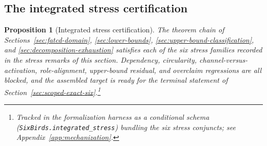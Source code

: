\documentclass[11pt]{article}
\newtheorem{proposition}[theorem]{Proposition}
\theoremstyle{definition}
\begin{document}
\subsection{The integrated stress certification}\label{subsec:integrated-stress-theorem}

\begin{proposition}[Integrated stress certification]\label{thm:integrated-stress}
The theorem chain of Sections~\ref{sec:fatcd-domain},
\ref{sec:lower-bounds}, \ref{sec:upper-bound-classification}, and
\ref{sec:decomposition-exhaustion} satisfies each of the six stress
families recorded in the stress remarks of this section.
Dependency, circularity, channel-versus-activation, role-alignment,
upper-bound residual, and overclaim regressions are all blocked, and
the assembled target is ready for the terminal statement of
Section~\ref{sec:scoped-exact-six}.\footnote{Tracked in the formalization harness as a conditional schema (\texttt{SixBirds.integrated\_stress}) bundling the six stress conjuncts; see Appendix~\ref{app:mechanization}.}
\end{proposition}
\end{document}
